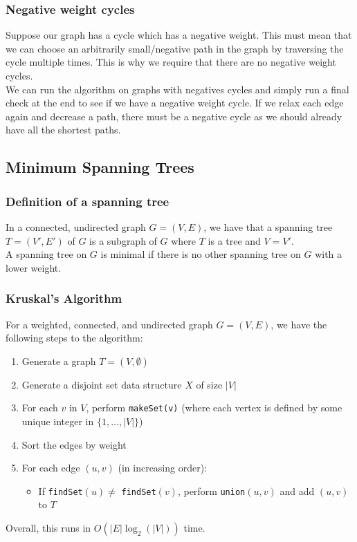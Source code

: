 \documentclass[a4paper, 12pt, twoside]{article}
\begin{document}
\subsubsection{Negative weight cycles}

Suppose our graph has a cycle which has a negative weight. 
This must mean that we can choose an arbitrarily small/negative 
path in the graph by traversing the cycle multiple times.
This is why we require that there are no negative weight cycles.
\\[\baselineskip]
We can run the algorithm on graphs with negatives cycles and
simply run a final check at the end to see if we have a negative weight cycle.
If we relax each edge again and decrease a path, there must be a negative cycle
as we should already have all the shortest paths.

\newpage

\subsection{Minimum Spanning Trees}

\subsubsection{Definition of a spanning tree}

In a connected, undirected graph $G = (V, E)$, we have that a
spanning tree $T = (V', E')$ of $G$ is a subgraph of $G$ where
$T$ is a tree and $V = V'$.
\\[\baselineskip]
A spanning tree on $G$ is minimal if there is no other spanning tree
on $G$ with a lower weight.

\subsubsection{Kruskal's Algorithm}

For a weighted, connected, and undirected graph $G = (V, E)$, we have 
the following steps to the algorithm: \begin{enumerate}
  \item Generate a graph $T = (V, \emptyset)$
  \item Generate a disjoint set data structure $X$ of size $|V|$
  \item For each $v$ in $V$, perform \texttt{makeSet(v)} (where
  each vertex is defined by some unique integer in $\{1, \ldots, |V|\}$)
  \item Sort the edges by weight
  \item For each edge $(u, v)$ (in increasing order): \begin{itemize}
    \item If \texttt{findSet}$(u) \neq$ \texttt{findSet}$(v)$,
    perform \texttt{union}$(u, v)$ and add $(u, v)$ to $T$
  \end{itemize}
\end{enumerate} Overall, this runs in $O(|E| \log_2(|V|))$ time.
\end{document}
